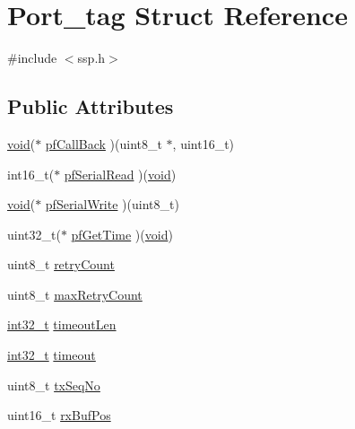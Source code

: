 \hypertarget{struct_port__tag}{\section{Port\-\_\-tag Struct Reference}
\label{struct_port__tag}
}


{\ttfamily \#include $<$ssp.\-h$>$}

\subsection*{Public Attributes}
\begin{DoxyCompactItemize}
\item 
\hyperlink{group___u_a_v_objects_plugin_ga444cf2ff3f0ecbe028adce838d373f5c}{void}($\ast$ \hyperlink{struct_port__tag_a76f9abf9220f4cd3949dabe2bdf087c9}{pf\-Call\-Back} )(uint8\-\_\-t $\ast$, uint16\-\_\-t)
\item 
int16\-\_\-t($\ast$ \hyperlink{struct_port__tag_a22effbba9213e57ac4ab1006a7474bc3}{pf\-Serial\-Read} )(\hyperlink{group___u_a_v_objects_plugin_ga444cf2ff3f0ecbe028adce838d373f5c}{void})
\item 
\hyperlink{group___u_a_v_objects_plugin_ga444cf2ff3f0ecbe028adce838d373f5c}{void}($\ast$ \hyperlink{struct_port__tag_a046a534a56d0809f721a001cd0aeac8a}{pf\-Serial\-Write} )(uint8\-\_\-t)
\item 
uint32\-\_\-t($\ast$ \hyperlink{struct_port__tag_ad20edc7518658654c85bc8580bb0e72d}{pf\-Get\-Time} )(\hyperlink{group___u_a_v_objects_plugin_ga444cf2ff3f0ecbe028adce838d373f5c}{void})
\item 
uint8\-\_\-t \hyperlink{struct_port__tag_a4b402cb1f1f50b59c0da70bdecaab4c2}{retry\-Count}
\item 
uint8\-\_\-t \hyperlink{struct_port__tag_a799f4edb9ea6e89612826ece3bc84923}{max\-Retry\-Count}
\item 
\hyperlink{glext_8h_a37994e3b11c72957c6f454c6ec96d43d}{int32\-\_\-t} \hyperlink{struct_port__tag_a30b430b0873e01809b763b0df92e62aa}{timeout\-Len}
\item 
\hyperlink{glext_8h_a37994e3b11c72957c6f454c6ec96d43d}{int32\-\_\-t} \hyperlink{struct_port__tag_a1429dc9140577fa5d31205c4a51ce6f7}{timeout}
\item 
uint8\-\_\-t \hyperlink{struct_port__tag_af9374ecad6056fa238ffb54dacd953f0}{tx\-Seq\-No}
\item 
uint16\-\_\-t \hyperlink{struct_port__tag_a65be5575b4a5f28bf7c8ccfd855f3020}{rx\-Buf\-Pos}
\item 

\end{DoxyCompactItemize}
